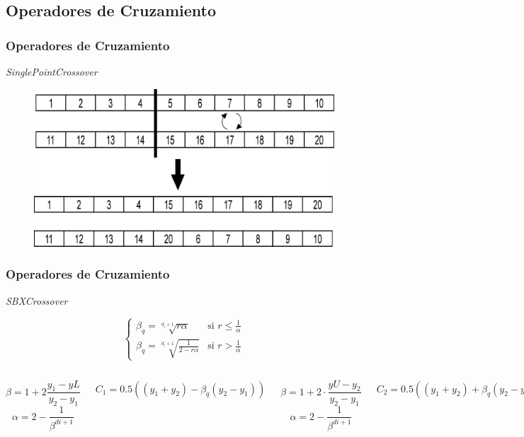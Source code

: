 \documentclass[9pt]{beamer}
\begin{document}
    \subsection{Operadores de Cruzamiento}
    \begin{frame}
        \frametitle{Operadores de Cruzamiento}
        \textit{SinglePointCrossover}

        \begin{figure}
            \includegraphics[width=\textwidth]{assets/Anexo/Crossover.eps}
        \end{figure}

    \end{frame}

    \begin{frame}
        \frametitle{Operadores de Cruzamiento}
        \textit{SBXCrossover}
        
        $$
        \begin{cases} 
            \beta_q=\sqrt[d_i+1]{r\alpha} & \text{si $r\leq \frac{1}{\alpha}$} \\ 
            \beta_q=\sqrt[d_i+1]{\frac{1}{2-r\alpha}} &  \text{si $r > \frac{1}{\alpha}$}
        \end{cases}
        $$
        
        
        \begin{columns}
            $$\beta = 1 + 2\frac{y_1-yL}{y_2-y_1}$$
            $$\alpha = 2 - \frac{1}{\beta^{di+1}}$$
            
            $$C_1 = 0.5 ((y_1+y_2)-\beta_q(y_2-y_1))$$
            
            $$\beta = 1 + 2 \cdot \frac{yU-y_2}{y_2-y_1}$$
            $$\alpha = 2 - \frac{1}{\beta^{di+1}}$$
            
            $$C_2 = 0.5 ((y_1+y_2)+\beta_q(y_2-y_1))$$
        \end{columns}
        
    \end{frame}
    
\end{document}
